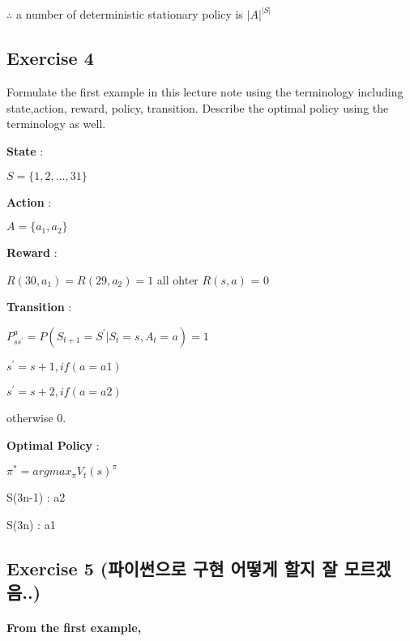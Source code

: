 \documentclass[
  a4paper]{article}
\begin{document}
\(\therefore\) a number of deterministic stationary policy is
\(|A|^{|S|}\)

\newpage

\hypertarget{exercise-4}{%
\subsection{Exercise 4}\label{exercise-4}}

Formulate the first example in this lecture note using the terminology
including state,action, reward, policy, transition. Describe the optimal
policy using the terminology as well.

\textbf{State} :

\(S = \{1,2,\dots ,31\}\)

\textbf{Action} :

\(A = \{a_1,a_2\}\)

\textbf{Reward} :

\(R(30,a_1)=R(29,a_2)=1\) all ohter \(R(s,a)\) = 0

\textbf{Transition} :

\(P_{ss^\prime}^a =P(S_{t+1}=S^{\prime} |S_t=s, A_t=a) =1\)

\(s^{\prime}=s+1, if(a=a1)\)

\(s^{\prime}=s+2, if(a=a2)\)

otherwise 0.

\textbf{Optimal Policy} :

\(\pi^*=argmax_{\pi}V_t(s)^\pi\)

S(3n-1) : a2

S(3n) : a1

\newpage

\hypertarget{exercise-5-uxd30cuxc774uxc36cuxc73cuxb85c-uxad6cuxd604-uxc5b4uxb5bbuxac8c-uxd560uxc9c0-uxc798-uxbaa8uxb974uxaca0uxc74c..}{%
\subsection{Exercise 5 (파이썬으로 구현 어떻게 할지 잘
모르겠음..)}\label{exercise-5-uxd30cuxc774uxc36cuxc73cuxb85c-uxad6cuxd604-uxc5b4uxb5bbuxac8c-uxd560uxc9c0-uxc798-uxbaa8uxb974uxaca0uxc74c..}}

\vspace{10pt}

\hypertarget{from-the-first-example}{%
\paragraph{From the first example,}\label{from-the-first-example}}
\end{document}
